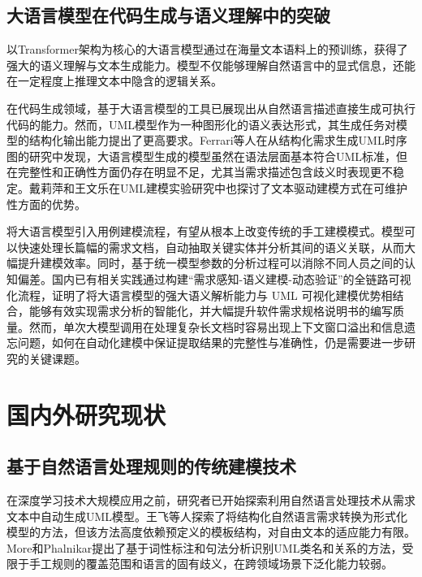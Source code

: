 \subsection{大语言模型在代码生成与语义理解中的突破}

以Transformer架构为核心的大语言模型通过在海量文本语料上的预训练，获得了强大的语义理解与文本生成能力\cite{vaswani2017attention}。模型不仅能够理解自然语言中的显式信息，还能在一定程度上推理文本中隐含的逻辑关系。

在代码生成领域，基于大语言模型的工具已展现出从自然语言描述直接生成可执行代码的能力。然而，UML模型作为一种图形化的语义表达形式，其生成任务对模型的结构化输出能力提出了更高要求。Ferrari等人\cite{ferrari2024model}在从结构化需求生成UML时序图的研究中发现，大语言模型生成的模型虽然在语法层面基本符合UML标准，但在完整性和正确性方面仍存在明显不足，尤其当需求描述包含歧义时表现更不稳定。戴莉萍和王文乐在UML建模实验研究中也探讨了文本驱动建模方式在可维护性方面的优势\cite{dailiping2021}。

将大语言模型引入用例建模流程，有望从根本上改变传统的手工建模模式。模型可以快速处理长篇幅的需求文档，自动抽取关键实体并分析其间的语义关联，从而大幅提升建模效率。同时，基于统一模型参数的分析过程可以消除不同人员之间的认知偏差。国内已有相关实践通过构建“需求感知-语义建模-动态验证”的全链路可视化流程，证明了将大语言模型的强大语义解析能力与 UML 可视化建模优势相结合，能够有效实现需求分析的智能化，并大幅提升软件需求规格说明书的编写质量\cite{yang2025software}。然而，单次大模型调用在处理复杂长文档时容易出现上下文窗口溢出和信息遗忘问题，如何在自动化建模中保证提取结果的完整性与准确性，仍是需要进一步研究的关键课题\cite{giannouris2025nomad}。

\section{国内外研究现状}

\subsection{基于自然语言处理规则的传统建模技术}

在深度学习技术大规模应用之前，研究者已开始探索利用自然语言处理技术从需求文本中自动生成UML模型。王飞等人\cite{wangfei2018}探索了将结构化自然语言需求转换为形式化模型的方法，但该方法高度依赖预定义的模板结构，对自由文本的适应能力有限。More和Phalnikar\cite{more2012generating}提出了基于词性标注和句法分析识别UML类名和关系的方法，受限于手工规则的覆盖范围和语言的固有歧义，在跨领域场景下泛化能力较弱。

